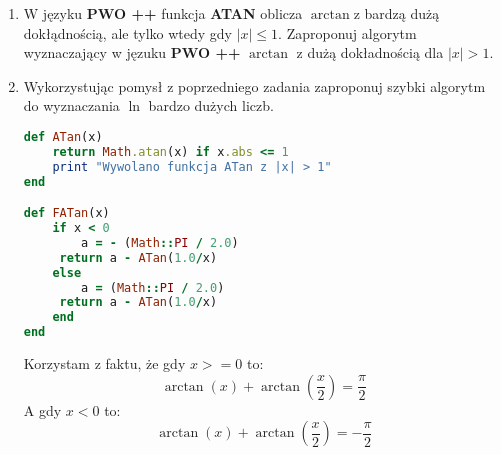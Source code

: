 \documentclass[fleqn]{article}
\begin{document}
\begin{enumerate}
\item W języku \textbf{PWO ++} funkcja \textbf{ATAN} oblicza $ \arctan$z bardzą dużą dokłądnością, ale tylko wtedy gdy $ |x| \leq 1 $. Zaproponuj algorytm wyznaczający w jęzuku  \textbf{PWO ++} $ \arctan $ z dużą dokładnością dla $ |x| > 1 $.
 \item Wykorzystując pomysł z poprzedniego zadania zaproponuj szybki algorytm do wyznaczania $ \ln $ bardzo dużych liczb.\\
 \begin{lstlisting}[language=Ruby, caption= Kod w Ruby]
def ATan(x)
    return Math.atan(x) if x.abs <= 1
    print "Wywolano funkcja ATan z |x| > 1"
end

def FATan(x)
    if x < 0
        a = - (Math::PI / 2.0)
     return a - ATan(1.0/x)
    else
        a = (Math::PI / 2.0)
     return a - ATan(1.0/x)
    end
end
\end{lstlisting}
Korzystam z faktu, że gdy $ x >= 0 $ to:
\[\arctan(x) + \arctan(\frac{x}{2}) =\frac{\pi}{2}\]
A gdy $ x < 0 $ to:
\[\arctan(x) + \arctan(\frac{x}{2}) =-\frac{\pi}{2}\]
 \end{enumerate}
\end{document}
